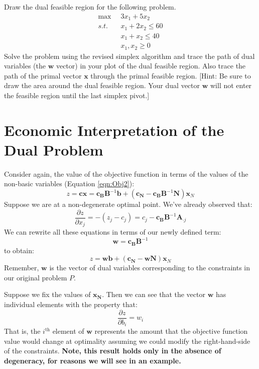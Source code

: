 \begin{exercise} Draw the dual feasible region for the following problem.
\begin{displaymath}
\begin{aligned}
\max\;\; & 3x_1 + 5x_2\\
s.t.\;\; & x_1 + 2x_2 \leq 60\\
& x_1 + x_2 \leq 40\\
& x_1, x_2 \geq 0
\end{aligned}
\end{displaymath}
Solve the problem using the revised simplex algorithm and trace the path of dual variables (the $\mathbf{w}$ vector) in your plot of the dual feasible region. Also trace the path of the primal vector $\mathbf{x}$ through the primal feasible region. [Hint: Be sure to draw the area around the dual feasible region. Your dual vector $\mathbf{w}$ will not enter the feasible region until the last simplex pivot.]
\end{exercise}

\section{Economic Interpretation of the Dual Problem}
Consider again, the value of the objective function in terms of the values of the non-basic variables (Equation \ref{eqn:Obj2}):
\begin{equation}
z=\mathbf{c}\mathbf{x} = 
\mathbf{c_B}\mathbf{B}^{-1}\mathbf{b} + 
\left(\mathbf{c_N} - \mathbf{c_B}\mathbf{B}^{-1}\mathbf{N}\right)\mathbf{x}_N
\end{equation}
Suppose we are at a non-degenerate optimal point. We've already observed that:
\begin{equation}
\frac{\partial z}{\partial x_j} = -(z_j - c_j) = c_j - \mathbf{c}_\mathbf{B}\mathbf{B}^{-1}\mathbf{A}_{\cdot j}
\end{equation}
We can rewrite all these equations in terms of our newly defined term:
\begin{equation}
\mathbf{w} = \mathbf{c}_{\mathbf{B}}\mathbf{B}^{-1}
\end{equation}
to obtain:
\begin{equation}
z = \mathbf{w}\mathbf{b} + 
\left(\mathbf{c_N} - \mathbf{w}\mathbf{N}\right)\mathbf{x}_N
\end{equation}
Remember, $\mathbf{w}$ is the vector of dual variables corresponding to the constraints in our original problem $P$.
 
Suppose we fix the values of $\mathbf{x}_{\mathbf{N}}$. Then we can see that the vector $\mathbf{w}$ has individual elements with the property that:
\begin{equation}
\frac{\partial z}{\partial b_i} = w_i 
\end{equation}
That is, the $i^\text{th}$ element of $\mathbf{w}$ represents the amount that the objective function value would change at optimality assuming we could modify the right-hand-side of the constraints. \textbf{Note, this result holds only in the absence of degeneracy, for reasons we will see in an example.}

